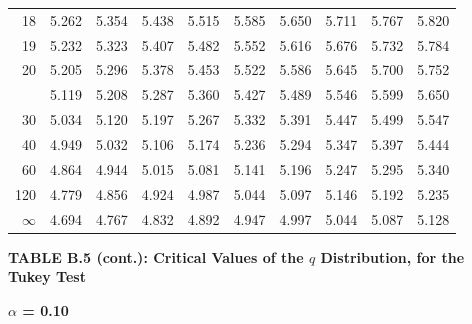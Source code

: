 \documentclass[10pt]{article}
\begin{document}
\begin{longtable}{@{}r!{\vrule width 0.8pt\hspace{0.55em}}rrrrrrrrr@{}}
18 & 5.262 & 5.354 & 5.438 & 5.515 & 5.585 & 5.650 & 5.711 & 5.767 & 5.820 \\
19 & 5.232 & 5.323 & 5.407 & 5.482 & 5.552 & 5.616 & 5.676 & 5.732 & 5.784 \\
20 & 5.205 & 5.296 & 5.378 & 5.453 & 5.522 & 5.586 & 5.645 & 5.700 & 5.752 \\
 & 5.119 & 5.208 & 5.287 & 5.360 & 5.427 & 5.489 & 5.546 & 5.599 & 5.650 \\
30 & 5.034 & 5.120 & 5.197 & 5.267 & 5.332 & 5.391 & 5.447 & 5.499 & 5.547 \\
40 & 4.949 & 5.032 & 5.106 & 5.174 & 5.236 & 5.294 & 5.347 & 5.397 & 5.444 \\
60 & 4.864 & 4.944 & 5.015 & 5.081 & 5.141 & 5.196 & 5.247 & 5.295 & 5.340 \\
120 & 4.779 & 4.856 & 4.924 & 4.987 & 5.044 & 5.097 & 5.146 & 5.192 & 5.235 \\
\addlinespace[0.30em]
$\infty$ & 4.694 & 4.767 & 4.832 & 4.892 & 4.947 & 4.997 & 5.044 & 5.087 & 5.128 \\
\end{longtable}
\newpage
\thispagestyle{empty}
\begin{center}
{\large\bfseries TABLE B.5 (cont.): Critical Values of the $q$ Distribution, for the Tukey Test\par}
\end{center}
{\large\bfseries $\alpha$ = 0.10\par}
\vspace{0.45em}
\small
\end{document}
